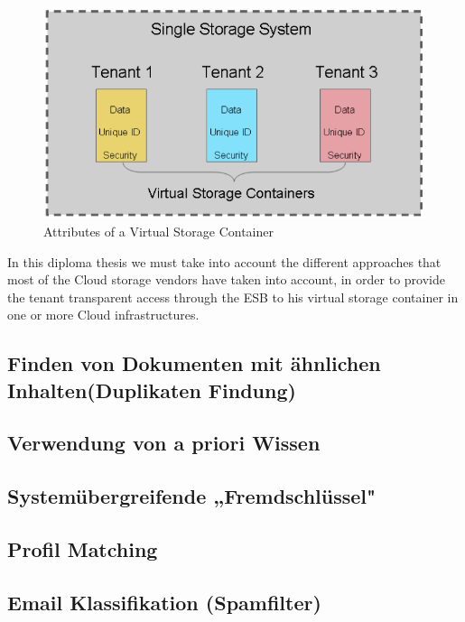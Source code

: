 \begin{figure}[htb]
	\centering
		\includegraphics[clip, scale=0.4]{./gfx/virtualstoragecontainer.png}
	\caption[Virtual Storage Container]{Attributes of a Virtual Storage Container \cite{feresten2010}}
	\label{fig:virtualstoragecontainer}
\end{figure}

In this diploma thesis we must take into account the different approaches that most of the Cloud storage vendors have taken into account, in order to provide the tenant transparent access through the \ac{ESB} to his virtual storage container in one or more Cloud infrastructures.

\subsection{Finden von Dokumenten mit ähnlichen Inhalten(Duplikaten Findung)}
\subsection{Verwendung von a priori Wissen}
\subsection{Systemübergreifende „Fremdschlüssel"}
\subsection{Profil Matching}
\subsection{Email Klassifikation (Spamfilter)}
